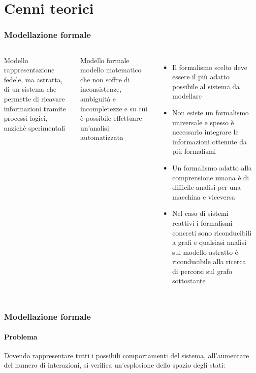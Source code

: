 \section {Cenni teorici}

\begin {frame}
\frametitle {Modellazione formale}
\begin{columns}
	\begin{block}
		{Modello} rappresentazione fedele, ma astratta, di un sistema che permette di ricavare informazioni tramite processi logici, anzich\'e sperimentali
	\end{block}
	\begin{block}
		{Modello formale} modello matematico che non soffre di \alert{inconsistenze}, \alert{ambiguit\`a} e \alert{incompletezze} e su cui \`e possibile effettuare un'analisi \alert{automatizzata}
	\end{block}
	\begin{itemize}
		\item Il formalismo scelto deve essere il pi\`u adatto possibile al sistema da modellare
		\item Non esiste un formalismo universale e spesso \`e necessario integrare le informazioni ottenute da pi\`u formalismi
		\item Un formalismo adatto alla comprensione umana \`e di difficile analisi per una macchina e viceversa
		\item Nel caso di \alert{sistemi reattivi} i formalismi concreti sono riconducibili a grafi e qualsiasi analisi sul modello astratto \`e riconducibile alla ricerca di percorsi sul grafo sottostante
	\end{itemize}

\end{columns}
\end{frame}



\begin {frame}
\frametitle {Modellazione formale}
\framesubtitle {Problema}
Dovendo rappresentare tutti i possibili comportamenti del sistema, all'aumentare del numero di interazioni, si verifica un'\alert{esplosione dello spazio degli stati}:


	\begin{columns}
	\end{columns}
	


\end{frame}

